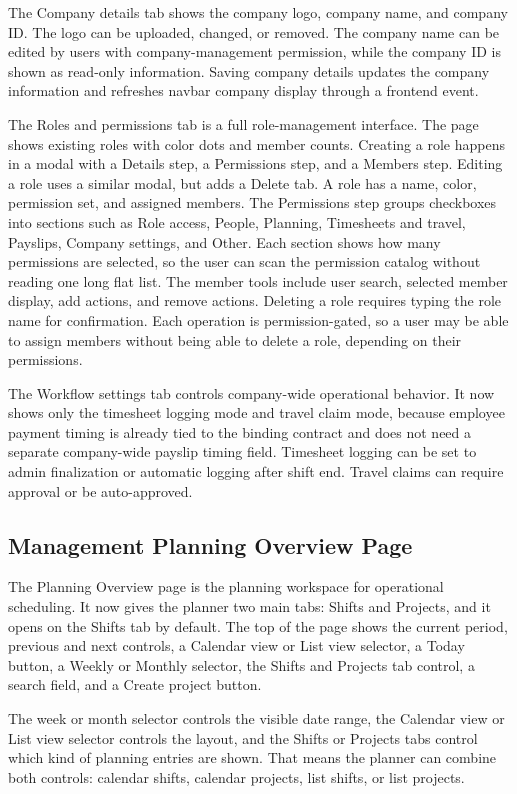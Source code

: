 \documentclass[11pt]{article}
\begin{document}
The Company details tab shows the company logo, company name, and company ID. The logo can be uploaded, changed, or removed. The company name can be edited by users with company-management permission, while the company ID is shown as read-only information. Saving company details updates the company information and refreshes navbar company display through a frontend event.

The Roles and permissions tab is a full role-management interface. The page shows existing roles with color dots and member counts. Creating a role happens in a modal with a Details step, a Permissions step, and a Members step. Editing a role uses a similar modal, but adds a Delete tab. A role has a name, color, permission set, and assigned members. The Permissions step groups checkboxes into sections such as Role access, People, Planning, Timesheets and travel, Payslips, Company settings, and Other. Each section shows how many permissions are selected, so the user can scan the permission catalog without reading one long flat list. The member tools include user search, selected member display, add actions, and remove actions. Deleting a role requires typing the role name for confirmation. Each operation is permission-gated, so a user may be able to assign members without being able to delete a role, depending on their permissions.

The Workflow settings tab controls company-wide operational behavior. It now shows only the timesheet logging mode and travel claim mode, because employee payment timing is already tied to the binding contract and does not need a separate company-wide payslip timing field. Timesheet logging can be set to admin finalization or automatic logging after shift end. Travel claims can require approval or be auto-approved.

\subsection{Management Planning Overview Page}

The Planning Overview page is the planning workspace for operational scheduling. It now gives the planner two main tabs: Shifts and Projects, and it opens on the Shifts tab by default. The top of the page shows the current period, previous and next controls, a Calendar view or List view selector, a Today button, a Weekly or Monthly selector, the Shifts and Projects tab control, a search field, and a Create project button.

The week or month selector controls the visible date range, the Calendar view or List view selector controls the layout, and the Shifts or Projects tabs control which kind of planning entries are shown. That means the planner can combine both controls: calendar shifts, calendar projects, list shifts, or list projects.
\end{document}
